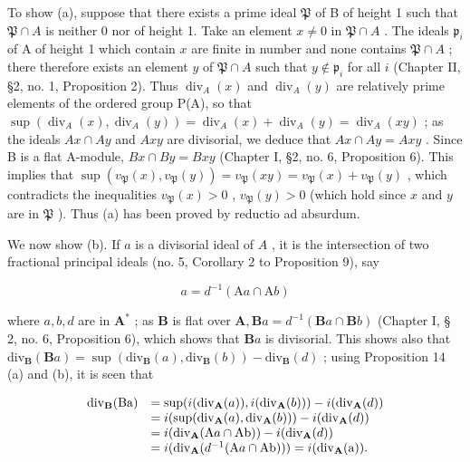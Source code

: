 To show (a), suppose that there exists a prime ideal \(\mathfrak{P}\) of B of height 1 such that \(\mathfrak{P} \cap A\) is neither 0 nor of height 1. Take an element \(x \neq 0\) in \(\mathfrak{P} \cap A\) . The ideals \(\mathfrak{p}_i\) of A of height 1 which contain \(x\) are finite in number and none contains \(\mathfrak{P} \cap A\) ; there therefore exists an element \(y\) of \(\mathfrak{P} \cap A\) such that \(y \notin \mathfrak{p}_i\) for all \(i\) (Chapter II, §2, no. 1, Proposition 2). Thus \(\operatorname{div}_{A}(x)\) and \(\operatorname{div}_{A}(y)\) are relatively prime elements of the ordered group P(A), so that \(\sup (\operatorname{div}_{A}(x), \operatorname{div}_{A}(y)) = \operatorname{div}_{A}(x) + \operatorname{div}_{A}(y) = \operatorname{div}_{A}(xy)\) ; as the ideals \(Ax \cap Ay\) and \(Axy\) are divisorial, we deduce that \(Ax \cap Ay = Axy\) . Since B is a flat A-module, \(Bx \cap By = Bxy\) (Chapter I, §2, no. 6, Proposition 6). This implies that \(\sup (v_{\mathfrak{P}}(x), v_{\mathfrak{P}}(y)) = v_{\mathfrak{P}}(xy) = v_{\mathfrak{P}}(x) + v_{\mathfrak{P}}(y)\) , which contradicts the inequalities \(v_{\mathfrak{P}}(x) > 0\) , \(v_{\mathfrak{P}}(y) > 0\) (which hold since \(x\) and \(y\) are in \(\mathfrak{P}\) ). Thus (a) has been proved by reductio ad absurdum.

We now show (b). If \(a\) is a divisorial ideal of \(A\) , it is the intersection of two fractional principal ideals (no. 5, Corollary 2 to Proposition 9), say

\[
a = d ^ {- 1} (\mathrm{A} a \cap \mathrm{A} b)
\]

where \(a, b, d\) are in \(\mathbf{A}^*\) ; as \(\mathbf{B}\) is flat over \(\mathbf{A}, \mathbf{B}a = d^{-1}(\mathbf{B}a \cap \mathbf{B}b)\) (Chapter I, § 2, no. 6, Proposition 6), which shows that \(\mathbf{B}a\) is divisorial. This shows also that \(\mathrm{div}_{\mathbf{B}}(\mathbf{B}a) = \sup (\mathrm{div}_{\mathbf{B}}(a), \mathrm{div}_{\mathbf{B}}(b)) - \mathrm{div}_{\mathbf{B}}(d)\) ; using Proposition 14 (a) and (b), it is seen that

\[
\begin{array}{r l} \operatorname{div} _ {\mathbf {B}} (\mathrm{Ba}) & = \sup (i (\operatorname{div} _ {\mathbf {A}} (a)), i (\operatorname{div} _ {\mathbf {A}} (b))) - i (\operatorname{div} _ {\mathbf {A}} (d)) \\ & = i (\sup (\operatorname{div} _ {\mathbf {A}} (a), \operatorname{div} _ {\mathbf {A}} (b))) - i (\operatorname{div} _ {\mathbf {A}} (d)) \\ & = i (\operatorname{div} _ {\mathbf {A}} (\mathrm{A} a \cap \mathrm{Ab})) - i (\operatorname{div} _ {\mathbf {A}} (d)) \\ & = i (\operatorname{div} _ {\mathbf {A}} (d ^ {- 1} (\mathrm{A} a \cap \mathrm{Ab}))) = i (\operatorname{div} _ {\mathbf {A}} (\mathrm{a})). \end{array}
\]

